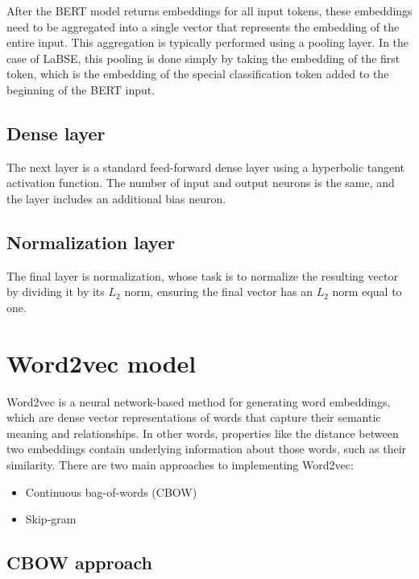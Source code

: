 After the BERT model returns embeddings for all input tokens, these embeddings need to be aggregated into a single vector that represents the embedding of the entire input. This aggregation is typically performed using a pooling layer. In the case of LaBSE, this pooling is done simply by taking the embedding of the first token, which is the embedding of the special classification token added to the beginning of the BERT input.

\subsection{Dense layer}

The next layer is a standard feed-forward dense layer using a hyperbolic tangent activation function. The number of input and output neurons is the same, and the layer includes an additional bias neuron.

\subsection{Normalization layer}

The final layer is normalization, whose task is to normalize the resulting vector by dividing it by its $L_2$ norm, ensuring the final vector has an $L_2$ norm equal to one.

\section{Word2vec model}
\label{theoryW2v}

Word2vec is a neural network-based method for generating word embeddings, which are dense vector representations of words that capture their semantic meaning and relationships. In other words, properties like the distance between two embeddings contain underlying information about those words, such as their similarity. There are two main approaches to implementing Word2vec:

\begin{itemize}
	\item Continuous bag-of-words (CBOW) 
	\item Skip-gram
\end{itemize}

\subsection{CBOW approach}

